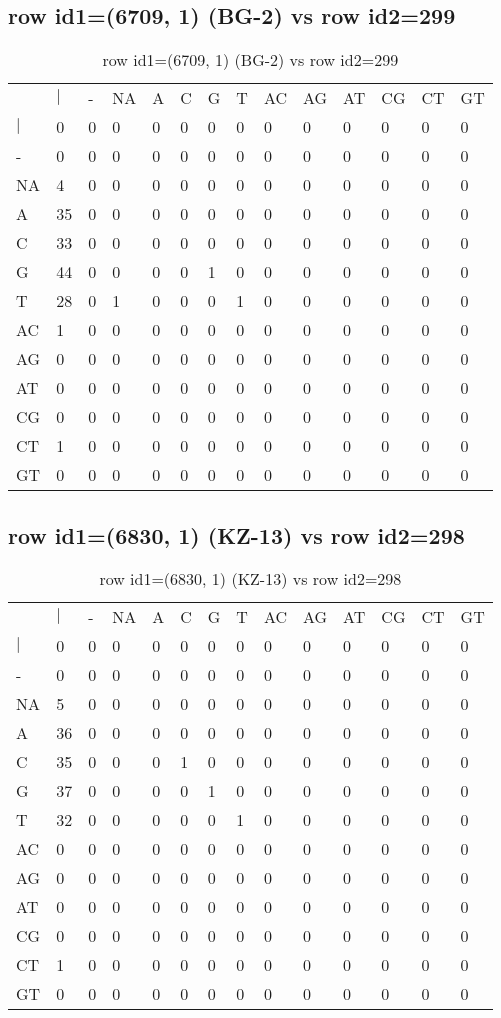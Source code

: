 \subsection{row id1=(6709, 1) (BG-2) vs row id2=299}
\begin{center}
\begin{longtable}{|l|l|l|l|l|l|l|l|l|l|l|l|l|l|}
\caption{row id1=(6709, 1) (BG-2) vs row id2=299} \label{table_dm56}\\
\hline
\\
\hline
&$|$&-&NA&A&C&G&T&AC&AG&AT&CG&CT&GT\\
$|$&0&0&0&0&0&0&0&0&0&0&0&0&0\\
-&0&0&0&0&0&0&0&0&0&0&0&0&0\\
NA&4&0&0&0&0&0&0&0&0&0&0&0&0\\
A&35&0&0&0&0&0&0&0&0&0&0&0&0\\
C&33&0&0&0&0&0&0&0&0&0&0&0&0\\
G&44&0&0&0&0&1&0&0&0&0&0&0&0\\
T&28&0&1&0&0&0&1&0&0&0&0&0&0\\
AC&1&0&0&0&0&0&0&0&0&0&0&0&0\\
AG&0&0&0&0&0&0&0&0&0&0&0&0&0\\
AT&0&0&0&0&0&0&0&0&0&0&0&0&0\\
CG&0&0&0&0&0&0&0&0&0&0&0&0&0\\
CT&1&0&0&0&0&0&0&0&0&0&0&0&0\\
GT&0&0&0&0&0&0&0&0&0&0&0&0&0\\
\hline
\end{longtable}
\end{center}

\subsection{row id1=(6830, 1) (KZ-13) vs row id2=298}
\begin{center}
\begin{longtable}{|l|l|l|l|l|l|l|l|l|l|l|l|l|l|}
\caption{row id1=(6830, 1) (KZ-13) vs row id2=298} \label{table_dm58}\\
\hline
\\
\hline
&$|$&-&NA&A&C&G&T&AC&AG&AT&CG&CT&GT\\
$|$&0&0&0&0&0&0&0&0&0&0&0&0&0\\
-&0&0&0&0&0&0&0&0&0&0&0&0&0\\
NA&5&0&0&0&0&0&0&0&0&0&0&0&0\\
A&36&0&0&0&0&0&0&0&0&0&0&0&0\\
C&35&0&0&0&1&0&0&0&0&0&0&0&0\\
G&37&0&0&0&0&1&0&0&0&0&0&0&0\\
T&32&0&0&0&0&0&1&0&0&0&0&0&0\\
AC&0&0&0&0&0&0&0&0&0&0&0&0&0\\
AG&0&0&0&0&0&0&0&0&0&0&0&0&0\\
AT&0&0&0&0&0&0&0&0&0&0&0&0&0\\
CG&0&0&0&0&0&0&0&0&0&0&0&0&0\\
CT&1&0&0&0&0&0&0&0&0&0&0&0&0\\
GT&0&0&0&0&0&0&0&0&0&0&0&0&0\\
\hline
\end{longtable}
\end{center}

